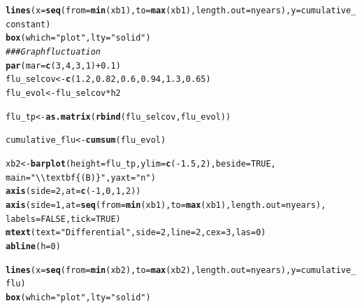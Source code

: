 \documentclass{article}\usepackage[]{graphicx}\usepackage[]{color}
\makeatletter
\newcommand{\hlnum}[1]{\textcolor[rgb]{0.686,0.059,0.569}{#1}}%
\newcommand{\hlstr}[1]{\textcolor[rgb]{0.192,0.494,0.8}{#1}}%
\newcommand{\hlcom}[1]{\textcolor[rgb]{0.678,0.584,0.686}{\textit{#1}}}%
\newcommand{\hlopt}[1]{\textcolor[rgb]{0,0,0}{#1}}%
\newcommand{\hlstd}[1]{\textcolor[rgb]{0.345,0.345,0.345}{#1}}%
\newcommand{\hlkwb}[1]{\textcolor[rgb]{0.69,0.353,0.396}{#1}}%
\newcommand{\hlkwc}[1]{\textcolor[rgb]{0.333,0.667,0.333}{#1}}%
\newcommand{\hlkwd}[1]{\textcolor[rgb]{0.737,0.353,0.396}{\textbf{#1}}}%
\newenvironment{kframe}{%
 \def\at@end@of@kframe{}%
 \ifinner\ifhmode%
  \def\at@end@of@kframe{\end{minipage}}%
  \begin{minipage}{\columnwidth}%
 \fi\fi%
 \def\FrameCommand##1{\hskip\@totalleftmargin \hskip-\fboxsep
 \colorbox{shadecolor}{##1}\hskip-\fboxsep
     \hskip-\linewidth \hskip-\@totalleftmargin \hskip\columnwidth}%
 \MakeFramed {\advance\hsize-\width
   \@totalleftmargin\z@ \linewidth\hsize
   \@setminipage}}%
 {\par\unskip\endMakeFramed%
 \at@end@of@kframe}
\newenvironment{knitrout}{}{} %
\makeatother
\begin{document}
\begin{knitrout}
\begin{kframe}
\begin{alltt}
\hlkwd{lines}\hlstd{(}\hlkwc{x}\hlstd{=}\hlkwd{seq}\hlstd{(}\hlkwc{from}\hlstd{=}\hlkwd{min}\hlstd{(xb1),} \hlkwc{to}\hlstd{=}\hlkwd{max}\hlstd{(xb1),} \hlkwc{length.out} \hlstd{= nyears),} \hlkwc{y}\hlstd{=cumulative_constant)}
\hlkwd{box}\hlstd{(}\hlkwc{which} \hlstd{=} \hlstr{"plot"}\hlstd{,} \hlkwc{lty} \hlstd{=} \hlstr{"solid"}\hlstd{)}
\hlcom{### Graph fluctuation}
\hlkwd{par}\hlstd{(}\hlkwc{mar}\hlstd{=}\hlkwd{c}\hlstd{(}\hlnum{3}\hlstd{,} \hlnum{4}\hlstd{,} \hlnum{3}\hlstd{,} \hlnum{1}\hlstd{)} \hlopt{+} \hlnum{0.1}\hlstd{)}
\hlstd{flu_selcov} \hlkwb{<-} \hlkwd{c}\hlstd{(}\hlnum{1.2}\hlstd{,}\hlnum{0.82}\hlstd{,}\hlnum{0.6}\hlstd{,}\hlnum{0.94}\hlstd{,}\hlnum{1.3}\hlstd{,}\hlnum{0.65}\hlstd{)}
\hlstd{flu_evol} \hlkwb{<-} \hlstd{flu_selcov} \hlopt{*} \hlstd{h2}

\hlstd{flu_tp} \hlkwb{<-} \hlkwd{as.matrix}\hlstd{(}\hlkwd{rbind}\hlstd{(flu_selcov, flu_evol))}

\hlstd{cumulative_flu} \hlkwb{<-} \hlkwd{cumsum}\hlstd{(flu_evol)}

\hlstd{xb2} \hlkwb{<-} \hlkwd{barplot}\hlstd{(}\hlkwc{height} \hlstd{= flu_tp,} \hlkwc{ylim} \hlstd{=} \hlkwd{c}\hlstd{(}\hlopt{-}\hlnum{1.5}\hlstd{,}\hlnum{2}\hlstd{),} \hlkwc{beside} \hlstd{=} \hlnum{TRUE}\hlstd{,}
               \hlkwc{main}\hlstd{=}\hlstr{"\textbackslash{}\textbackslash{}textbf\{(B)\}"}\hlstd{,} \hlkwc{yaxt}\hlstd{=}\hlstr{"n"}\hlstd{)}
\hlkwd{axis}\hlstd{(}\hlkwc{side}\hlstd{=}\hlnum{2}\hlstd{,} \hlkwc{at} \hlstd{=} \hlkwd{c}\hlstd{(}\hlopt{-}\hlnum{1}\hlstd{,}\hlnum{0}\hlstd{,}\hlnum{1}\hlstd{,}\hlnum{2}\hlstd{))}
\hlkwd{axis}\hlstd{(}\hlkwc{side}\hlstd{=}\hlnum{1}\hlstd{,} \hlkwc{at} \hlstd{=} \hlkwd{seq}\hlstd{(}\hlkwc{from}\hlstd{=}\hlkwd{min}\hlstd{(xb1),} \hlkwc{to}\hlstd{=}\hlkwd{max}\hlstd{(xb1),} \hlkwc{length.out} \hlstd{= nyears),}
     \hlkwc{labels} \hlstd{=} \hlnum{FALSE}\hlstd{,}\hlkwc{tick} \hlstd{=} \hlnum{TRUE}\hlstd{)}
\hlkwd{mtext}\hlstd{(}\hlkwc{text} \hlstd{=} \hlstr{"Differential"}\hlstd{,} \hlkwc{side} \hlstd{=} \hlnum{2}\hlstd{,} \hlkwc{line} \hlstd{=} \hlnum{2}\hlstd{,} \hlkwc{cex}\hlstd{=}\hlnum{3}\hlstd{,} \hlkwc{las}\hlstd{=}\hlnum{0}\hlstd{)}
\hlkwd{abline}\hlstd{(}\hlkwc{h}\hlstd{=}\hlnum{0}\hlstd{)}

\hlkwd{lines}\hlstd{(}\hlkwc{x}\hlstd{=}\hlkwd{seq}\hlstd{(}\hlkwc{from}\hlstd{=}\hlkwd{min}\hlstd{(xb2),} \hlkwc{to}\hlstd{=}\hlkwd{max}\hlstd{(xb2),} \hlkwc{length.out} \hlstd{= nyears),} \hlkwc{y}\hlstd{=cumulative_flu)}
\hlkwd{box}\hlstd{(}\hlkwc{which} \hlstd{=} \hlstr{"plot"}\hlstd{,} \hlkwc{lty} \hlstd{=} \hlstr{"solid"}\hlstd{)}


\end{alltt}
\end{kframe}
\end{knitrout}
\end{document}
